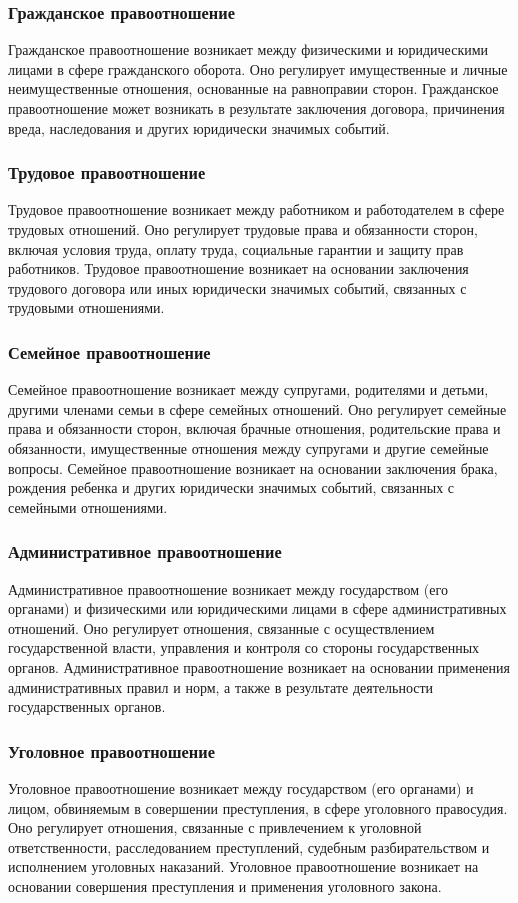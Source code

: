 \documentclass{article}
\begin{document}
\subsubsection{Гражданское правоотношение}
Гражданское правоотношение возникает между физическими и юридическими лицами в сфере гражданского оборота. Оно регулирует имущественные и личные неимущественные отношения, основанные на равноправии сторон. Гражданское правоотношение может возникать в результате заключения договора, причинения вреда, наследования и других юридически значимых событий.
\subsubsection{Трудовое правоотношение}
Трудовое правоотношение возникает между работником и работодателем в сфере трудовых отношений. Оно регулирует трудовые права и обязанности сторон, включая условия труда, оплату труда, социальные гарантии и защиту прав работников. Трудовое правоотношение возникает на основании заключения трудового договора или иных юридически значимых событий, связанных с трудовыми отношениями.
\subsubsection{Семейное правоотношение}
Семейное правоотношение возникает между супругами, родителями и детьми, другими членами семьи в сфере семейных отношений. Оно регулирует семейные права и обязанности сторон, включая брачные отношения, родительские права и обязанности, имущественные отношения между супругами и другие семейные вопросы. Семейное правоотношение возникает на основании заключения брака, рождения ребенка и других юридически значимых событий, связанных с семейными отношениями.
\subsubsection{Административное правоотношение}
Административное правоотношение возникает между государством (его органами) и физическими или юридическими лицами в сфере административных отношений. Оно регулирует отношения, связанные с осуществлением государственной власти, управления и контроля со стороны государственных органов. Административное правоотношение возникает на основании применения административных правил и норм, а также в результате деятельности государственных органов.
\subsubsection{Уголовное правоотношение}
Уголовное правоотношение возникает между государством (его органами) и лицом, обвиняемым в совершении преступления, в сфере уголовного правосудия. Оно регулирует отношения, связанные с привлечением к уголовной ответственности, расследованием преступлений, судебным разбирательством и исполнением уголовных наказаний. Уголовное правоотношение возникает на основании совершения преступления и применения уголовного закона.
\end{document}
